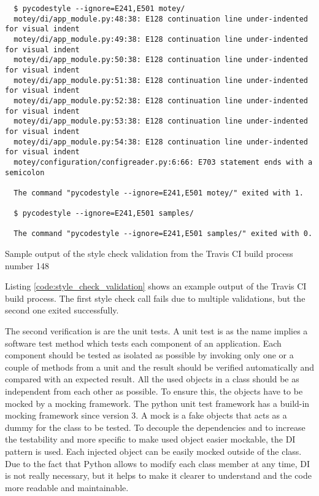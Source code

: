 \begin{listing}[H]
  \begin{verbatim}
  $ pycodestyle --ignore=E241,E501 motey/
  motey/di/app_module.py:48:38: E128 continuation line under-indented for visual indent
  motey/di/app_module.py:49:38: E128 continuation line under-indented for visual indent
  motey/di/app_module.py:50:38: E128 continuation line under-indented for visual indent
  motey/di/app_module.py:51:38: E128 continuation line under-indented for visual indent
  motey/di/app_module.py:52:38: E128 continuation line under-indented for visual indent
  motey/di/app_module.py:53:38: E128 continuation line under-indented for visual indent
  motey/di/app_module.py:54:38: E128 continuation line under-indented for visual indent
  motey/configuration/configreader.py:6:66: E703 statement ends with a semicolon

  The command "pycodestyle --ignore=E241,E501 motey/" exited with 1.

  $ pycodestyle --ignore=E241,E501 samples/

  The command "pycodestyle --ignore=E241,E501 samples/" exited with 0.
  \end{verbatim}
  \caption{Sample output of the style check validation from the Travis \ac{CI} build process number 148\autocite{Travis:Build:148}}
  \label{code:style_check_validation}
\end{listing}

Listing \ref{code:style_check_validation} shows an example output of the Travis \ac{CI} build process.
The first style check call fails due to multiple validations, but the second one exited successfully.\newline

The second verification is are the unit tests.
A unit test is as the name implies a software test method which tests each component of an application.
Each component should be tested as isolated as possible by invoking only one or a couple of methods from a unit and the result should be verified automatically and compared with an expected result.\autocite[cf.][p. 320]{Olan:2003:UTT:948785.948830}
All the used objects in a class should be as independent from each other as possible.
To ensure this, the objects have to be mocked by a mocking framework.
The python unit test framework has a build-in mocking framework since version 3.
A mock is a fake objects that acts as a dummy for the class to be tested.
To decouple the dependencies and to increase the testability and more specific to make used object easier mockable, the \ac{DI} pattern is used.
Each injected object can be easily mocked outside of the class.
Due to the fact that Python allows to modify each class member at any time, \ac{DI} is not really necessary, but it helps to make it clearer to understand and the code more readable and maintainable.\newline

